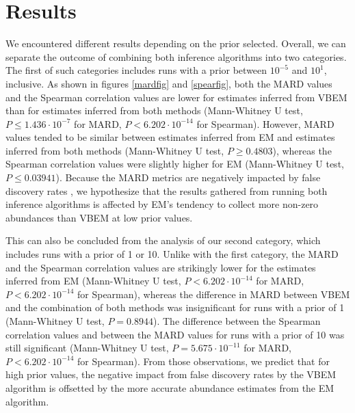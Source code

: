 \section{Results}
We encountered different results depending on the prior selected. Overall, we can separate the outcome of combining both inference algorithms into two categories. The first of such categories includes runs with a prior between $10^{-5}$ and $10^1$, inclusive. As shown in figures \ref{mardfig} and \ref{spearfig}, both the $\mathrm{MARD}$ values and the Spearman correlation values are lower for estimates inferred from VBEM than for estimates inferred from both methods (Mann-Whitney U test, $P\leq 1.436 \cdot  10^{-7}$ for MARD, $P < 6.202\cdot 10^{-14}$ for Spearman). However, MARD values tended to be similar between estimates inferred from EM and estimates inferred from both methods (Mann-Whitney U test, $P\geq 0.4803$), whereas the Spearman correlation values were slightly higher for EM (Mann-Whitney U test, $P\leq 0.03941$). Because the MARD metrics are negatively impacted by false discovery rates \cite{patro_salmon_2017}, we hypothesize that the results gathered from running both inference algorithms is affected by EM’s tendency to collect more non-zero abundances than VBEM at low prior values. 

This can also be concluded from the analysis of our second category, which includes runs with a prior of 1 or 10. Unlike with the first category, the $\mathrm{MARD}$ and the Spearman correlation values are strikingly lower for the estimates inferred from EM (Mann-Whitney U test, $P < 6.202\cdot 10^{-14}$ for $\mathrm{MARD}$, $P < 6.202\cdot 10^{-14}$ for Spearman), whereas the difference in MARD between VBEM and the combination of both methods was insignificant for runs with a prior of 1 (Mann-Whitney U test, $P = 0.8944$). The difference between the Spearman correlation values and between the MARD values for runs with a prior of 10 was still significant (Mann-Whitney U test, $P = 5.675 \cdot 10^{-11}$ for $\mathrm{MARD}$, $P < 6.202\cdot 10^{-14}$ for Spearman). From those observations, we predict that for high prior values, the negative impact from false discovery rates by the VBEM algorithm is offsetted by the more accurate abundance estimates from the EM algorithm. 
